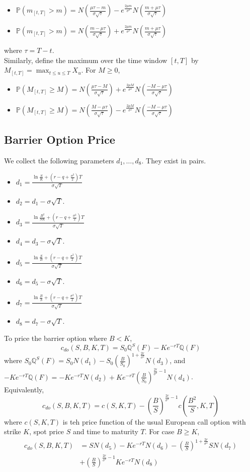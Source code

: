 \documentclass[12pt]{article}
\theoremstyle{definition}
\begin{document}
\begin{itemize}
  \item $\mathbb{P}(m_{[t,T]}>m)=N(\frac{\mu\tau-m}{\sigma\sqrt{\tau}})-e^{\frac{2\mu m}{\sigma^2}}N(\frac{m+\mu\tau}{\sigma\sqrt{\tau}})$
  \item $\mathbb{P}(m_{[t,T]}>m)=N(\frac{m-\mu\tau}{\sigma\sqrt{\tau}})+e^{\frac{2\mu m}{\sigma^2}}N(\frac{m+\mu\tau}{\sigma\sqrt{\tau}})$
\end{itemize}
where $\tau=T-t$.\\
Similarly, define the maximum over the time window $[t,T]$ by $M_{[t,T]}=\max_{t\leq u\leq T}X_u$. For $M\geq 0$,
\begin{itemize}
  \item $\mathbb{P}(M_{[t,T]}\geq M)=N(\frac{\mu\tau-M}{\sigma\sqrt{\tau}})+e^{\frac{2\mu M}{\sigma^2}}N(\frac{-M-\mu\tau}{\sigma\sqrt{\tau}})$
  \item $\mathbb{P}(M_{[t,T]}\geq M)=N(\frac{M-\mu\tau}{\sigma\sqrt{\tau}})-e^{\frac{2\mu M}{\sigma^2}}N(\frac{-M-\mu\tau}{\sigma\sqrt{\tau}})$
\end{itemize}
\subsection{Barrier Option Price}
We collect the following parameters $d_1,\ldots, d_8$. They exist in pairs.
\begin{itemize}
  \item $d_1=\frac{\ln\frac{S}{K}+(r-q+\frac{\sigma^2}{2})T}{\sigma\sqrt{T}}$
  \item $d_2=d_1-\sigma\sqrt{T}$.
  \item $d_3=\frac{\ln \frac{B^2}{SK}+(r-q+\frac{\sigma^2}{2})T}{\sigma\sqrt{T}}$
  \item $d_4=d_3-\sigma\sqrt{T}$.
  \item $d_5=\frac{\ln \frac{S}{B}+(r-q+\frac{\sigma^2}{2})T}{\sigma\sqrt{T}}$
  \item $d_6=d_5-\sigma\sqrt{T}$.
  \item $d_7=\frac{\ln \frac{B}{S}+(r-q+\frac{\sigma^2}{2})T}{\sigma\sqrt{T}}$
  \item $d_8=d_7-\sigma\sqrt{T}$.
\end{itemize}
To price the barrier option where $B<K$, 
\[
c_{do}(S,B,K,T)=S_0\mathbb{Q}^S(F)-Ke^{-rT}\mathbb{Q}(F)
\]
where $S_0\mathbb{Q}^S(F)=S_0N(d_1)-S_0(\frac{B}{S_0})^{1+\frac{2r}{\sigma^2}}N(d_3)$, and \\$-Ke^{-rT}\mathbb{Q}(F)=-Ke^{-rT}N(d_2)+Ke^{-rT}(\frac{B}{S_0})^{\frac{2r}{\sigma^2}-1}N(d_4)$.\\Equivalently, 
\[
c_{do}(S,B,K,T)=c(S,K,T)-(\frac{B}{S})^{\frac{2r}{\sigma^2}-1}c(\frac{B^2}{S},K,T)
\]
where $c(S,K,T)$ is teh price function of the usual European call option with strike $K$, spot price $S$ and time to maturity $T$.
For case $B\geq K$,
\begin{align*}
c_{do}(S,B,K,T)&=SN(d_5)-Ke^{-rT}N(d_6)-(\frac{B}{S})^{1+\frac{2r}{\sigma^2}}SN(d_7)\\
&+(\frac{B}{S})^{\frac{2r}{\sigma^2}-1}Ke^{-rT}N(d_8)
\end{align*}
\end{document}
